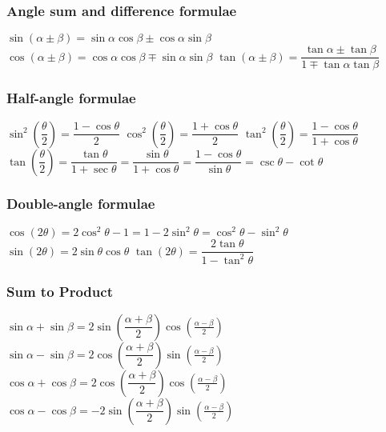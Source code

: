 \subsubsection{Angle sum and difference formulae}
\begin{itemize}
\itemt \( \sin(\alpha \pm \beta) = \sin \alpha\cos \beta \pm \cos \alpha\sin \beta \)
\itemt \( \cos(\alpha \pm \beta) = \cos \alpha\cos \beta \mp \sin \alpha \sin \beta \)
\itemt \( \tan(\alpha \pm \beta) = \dfrac{\tan \alpha \pm \tan \beta}{1 \mp \tan \alpha \tan \beta}\)
\end{itemize}

\subsubsection{Half-angle formulae}
\begin{itemize}
\itemt \( \sin^2(\dfrac{\theta}{2}) = \dfrac{1-\cos\theta}{2} \)
\itemt \( \cos^2(\dfrac{\theta}{2}) = \dfrac{1+\cos\theta}{2} \)
\itemt \( \tan^2(\dfrac{\theta}{2}) = \dfrac{1-\cos\theta}{1+\cos\theta} \)
\itemt \( \tan(\dfrac{\theta}{2}) = \dfrac{\tan\theta}{1+\sec\theta} = \dfrac{\sin\theta}{1+\cos\theta} = \dfrac{1 - \cos\theta}{\sin\theta} = \csc\theta - \cot\theta\)
\end{itemize}

\subsubsection{Double-angle formulae}
\begin{itemize}
\itemt \( \cos(2\theta) = 2\cos^2 \theta - 1 = 1 - 2\sin^2 \theta = \cos^2\theta - \sin^2 \theta \)
\itemt \( \sin(2\theta) = 2\sin \theta \cos \theta \)
\itemt \( \tan(2\theta) = \dfrac{2\tan \theta}{1-\tan^2 \theta} \)
\end{itemize}

\subsubsection{Sum to Product}
\begin{itemize}
\itemt \( \sin \alpha + \sin \beta = 2\sin(\dfrac{\alpha+\beta}{2})\cos(\frac{\alpha-\beta}{2}) \)
\itemt \( \sin \alpha - \sin \beta = 2\cos(\dfrac{\alpha+\beta}{2})\sin(\frac{\alpha-\beta}{2}) \)
\itemt \( \cos \alpha + \cos \beta = 2\cos(\dfrac{\alpha+\beta}{2})\cos(\frac{\alpha-\beta}{2}) \)
\itemt \( \cos \alpha - \cos \beta = -2\sin(\dfrac{\alpha+\beta}{2})\sin(\frac{\alpha-\beta}{2}) \)
\end{itemize}

